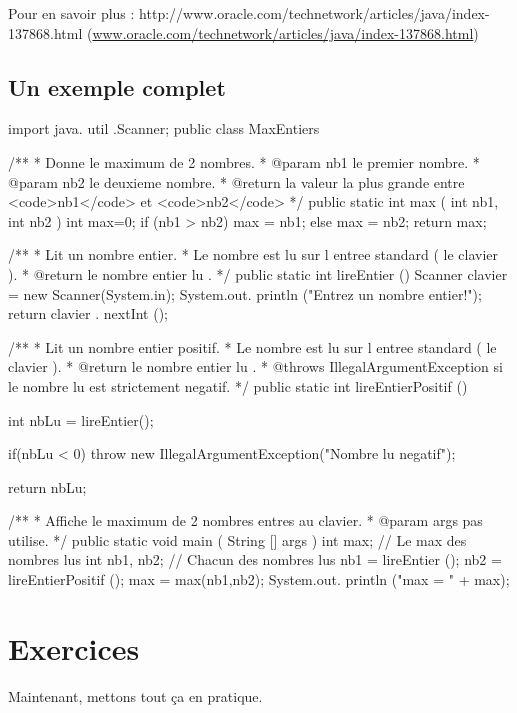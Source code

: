 \documentclass[11pt,a4paper]{article}
\begin{document}
            \par
        
        Pour en savoir plus : 
        http://www.oracle.com/technetwork/articles/java/index-137868.html (\url{www.oracle.com/technetwork/articles/java/index-137868.html})
            \par
        \subsection{Un exemple complet}\begin{Java}

import java. util .Scanner;
public class MaxEntiers {
    /**
    * Donne le maximum de 2 nombres.
    * @param nb1 le premier nombre.
    * @param nb2 le deuxieme nombre.
    * @return la valeur la plus grande entre <code>nb1</code> et <code>nb2</code>
    */
    public static int max ( int nb1, int nb2 ) {
      int max=0;
      if (nb1 > nb2) {
        max = nb1;
      } else {
        max = nb2;
      }
      return max;
    }
    
    /**
    * Lit un nombre entier.
    * Le nombre est lu sur l entree standard ( le clavier ).
    * @return le nombre entier lu .
    */
    public static int lireEntier () {
      Scanner clavier = new Scanner(System.in);
      System.out. println ("Entrez un nombre entier!");
      return clavier . nextInt ();
    }
    
    /**
    * Lit un nombre entier positif.
    * Le nombre est lu sur l entree standard ( le clavier ).
    * @return le nombre entier lu .
    * @throws IllegalArgumentException si le nombre lu est strictement negatif.
    */
    public static int lireEntierPositif () {
      int nbLu = lireEntier();
      
      if(nbLu < 0)
        throw new IllegalArgumentException("Nombre lu negatif");
      
      return nbLu;
    }
    
    /**
    * Affiche le maximum de 2 nombres entres au clavier.
    * @param args pas utilise.
    */
    public static void main ( String [] args ) {
      int max; // Le max des nombres lus
      int nb1, nb2; // Chacun des nombres lus
      nb1 = lireEntier ();
      nb2 = lireEntierPositif ();
      max = max(nb1,nb2);
      System.out. println ("max = " + max);
    }
}				\end{Java}\section{Exercices}
				Maintenant, mettons tout \c ca en pratique.
      
\end{document}
